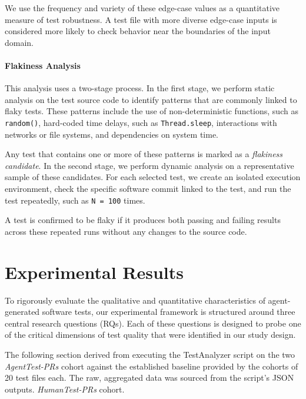 \documentclass[conference]{IEEEtran}
\begin{document}
We use the frequency and variety of these edge-case values as a quantitative measure of test robustness. A test file with more diverse edge-case inputs is considered more likely to check behavior near the boundaries of the input domain.

\paragraph{\textbf{Flakiness Analysis}}
This analysis uses a two-stage process. In the first stage, we perform static analysis on the test source code to identify patterns that are commonly linked to flaky tests. These patterns include the use of non-deterministic functions, such as \texttt{random()}, hard-coded time delays, such as \texttt{Thread.sleep}, interactions with networks or file systems, and dependencies on system time.

Any test that contains one or more of these patterns is marked as a \textit{flakiness candidate}. In the second stage, we perform dynamic analysis on a representative sample of these candidates. For each selected test, we create an isolated execution environment, check the specific software commit linked to the test, and run the test repeatedly, such as \texttt{N = 100} times.

A test is confirmed to be flaky if it produces both passing and failing results across these repeated runs without any changes to the source code.

 
 \section{Experimental Results}
\label{Section:Result}
To rigorously evaluate the qualitative and quantitative characteristics of agent-generated software tests, our experimental framework is structured around three central research questions (RQs). Each of these questions is designed to probe one of the critical dimensions of test quality that were identified in our study design. %

The following section %
 derived from executing the TestAnalyzer script on the two
\textit{AgentTest-PRs} cohort against the established baseline provided by the cohorts of 20 test files each. The raw, aggregated data was sourced from the script's JSON outputs.
\textit{HumanTest-PRs} cohort.
\end{document}
